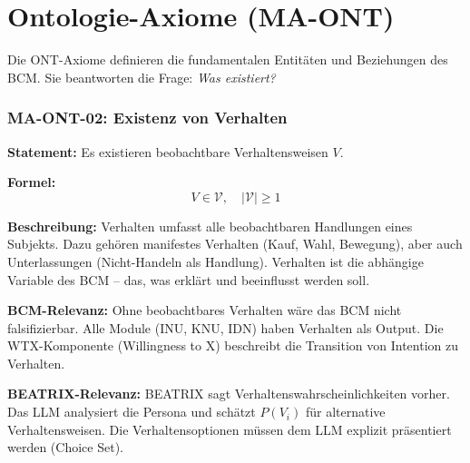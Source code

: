 
\section{Ontologie-Axiome (MA-ONT)}

Die ONT-Axiome definieren die fundamentalen Entitäten und Beziehungen des BCM.
Sie beantworten die Frage: \textit{Was existiert?}



\subsubsection*{MA-ONT-02: Existenz von Verhalten}

\textbf{Statement:} Es existieren beobachtbare Verhaltensweisen $V$.

\textbf{Formel:}
\begin{equation}
V \in \mathcal{V}, \quad |\mathcal{V}| \geq 1
\end{equation}

\textbf{Beschreibung:}
Verhalten umfasst alle beobachtbaren Handlungen eines Subjekts. Dazu gehören manifestes Verhalten (Kauf, Wahl, Bewegung), aber auch Unterlassungen (Nicht-Handeln als Handlung). Verhalten ist die abhängige Variable des BCM -- das, was erklärt und beeinflusst werden soll.

\textbf{BCM-Relevanz:}
Ohne beobachtbares Verhalten wäre das BCM nicht falsifizierbar. Alle Module (INU, KNU, IDN) haben Verhalten als Output. Die WTX-Komponente (Willingness to X) beschreibt die Transition von Intention zu Verhalten.

\textbf{BEATRIX-Relevanz:}
BEATRIX sagt Verhaltenswahrscheinlichkeiten vorher. Das LLM analysiert die Persona und schätzt $P(V_i)$ für alternative Verhaltensweisen. Die Verhaltensoptionen müssen dem LLM explizit präsentiert werden (Choice Set).

